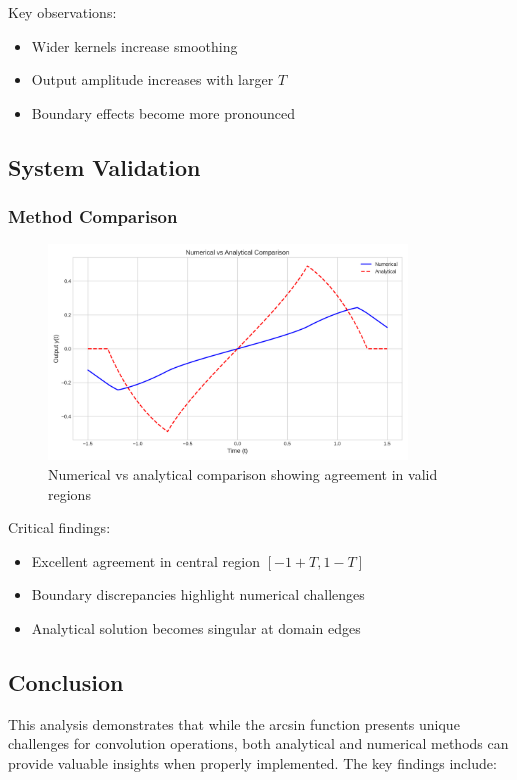 Key observations:
\begin{itemize}
\item Wider kernels increase smoothing
\item Output amplitude increases with larger $T$
\item Boundary effects become more pronounced
\end{itemize}

\subsection{System Validation}

\subsubsection{Method Comparison}
\begin{figure}[H]
    \centering
    \includegraphics[width=0.85\textwidth]{codes/codes_sin_1_and_arcsin/figures/comparison.png}
    \caption{Numerical vs analytical comparison showing agreement in valid regions}
    \label{fig:comparison}
\end{figure}

Critical findings:
\begin{itemize}
\item Excellent agreement in central region $[-1+T, 1-T]$
\item Boundary discrepancies highlight numerical challenges
\item Analytical solution becomes singular at domain edges
\end{itemize}

\subsection{Conclusion}
This analysis demonstrates that while the arcsin function presents unique challenges for convolution operations, both analytical and numerical methods can provide valuable insights when properly implemented. The key findings include:

